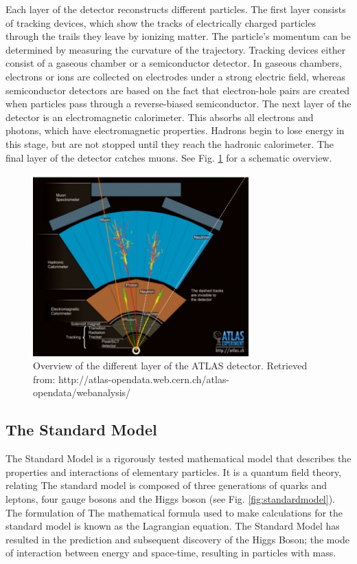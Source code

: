 \documentclass[runningheads,a4paper]{llncs}
\begin{document}
Each layer of the detector reconstructs different particles. The first layer consists of tracking devices, which show the tracks of electrically charged particles through the trails they leave by ionizing matter. The particle’s momentum can be determined by measuring the curvature of the trajectory. Tracking devices either consist of a gaseous chamber or a semiconductor detector. In gaseous chambers, electrons or ions are collected on electrodes under a strong electric field, whereas semiconductor detectors are based on the fact that electron-hole pairs are created when particles pass through a reverse-biased semiconductor. The next layer of the detector is an electromagnetic calorimeter. This absorbs all electrons and photons, which have electromagnetic properties. Hadrons begin to lose energy in this stage, but are not stopped until they reach the hadronic calorimeter. The final layer of the detector catches muons. See Fig. \ref{fig:atlas} for a schematic overview. \cite{aad2012observation}

\begin{figure}
\centering
\includegraphics[height=7cm]{atlas}
\caption{Overview of the different layer of the ATLAS detector. Retrieved from:
http://atlas-opendata.web.cern.ch/atlas-opendata/webanalysis/}
\label{fig:atlas}
\end{figure}

\subsection{The Standard Model}

The Standard Model is a rigorously tested mathematical model that describes the properties and interactions of elementary particles. It is a quantum field theory, relating The standard model is composed of three generations of quarks and leptons, four gauge bosons and the Higgs boson (see Fig. \ref{fig:standardmodel}). The formulation of The mathematical formula used to make calculations for the standard model is known as the Lagrangian equation. The Standard Model has resulted in the prediction and subsequent discovery of the Higgs Boson; the mode of interaction between energy and space-time, resulting in particles with mass.
\end{document}

